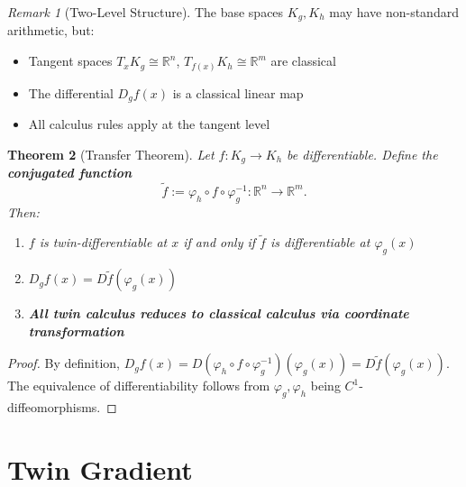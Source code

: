 \documentclass[11pt,twoside]{book}
\theoremstyle{plain}
\newtheorem{theorem}{Theorem}[chapter]
\theoremstyle{definition}
\theoremstyle{remark}
\newtheorem{remark}[theorem]{Remark}
\newcommand{\R}{\mathbb{R}}
\newcommand{\Kg}{K_g}
\newcommand{\Dg}{D_g}
\begin{document}
\begin{remark}[Two-Level Structure]
    The base spaces $\Kg, K_h$ may have non-standard arithmetic, but:
    \begin{itemize}
        \item Tangent spaces $T_x \Kg \cong \R^n$, $T_{f(x)} K_h \cong \R^m$ are classical
        \item The differential $\Dg f(x)$ is a classical linear map
        \item All calculus rules apply at the tangent level
    \end{itemize}
\end{remark}

\begin{theorem}[Transfer Theorem]
    \label{thm:transfer}
    Let $f : \Kg \to K_h$ be differentiable. Define the \textbf{conjugated function}
    \[
    \tilde{f} := \varphi_h \circ f \circ \varphi_g^{-1} : \R^n \to \R^m.
    \]
    Then:
    \begin{enumerate}
        \item $f$ is twin-differentiable at $x$ if and only if $\tilde{f}$ is differentiable at $\varphi_g(x)$
        \item $\Dg f(x) = D\tilde{f}(\varphi_g(x))$
        \item \textbf{All twin calculus reduces to classical calculus via coordinate transformation}
    \end{enumerate}
    
    \begin{center}
    \end{center}
\end{theorem}

\begin{proof}
    By definition, $\Dg f(x) = D(\varphi_h \circ f \circ \varphi_g^{-1})(\varphi_g(x)) = D\tilde{f}(\varphi_g(x))$. The equivalence of differentiability follows from $\varphi_g, \varphi_h$ being $C^1$-diffeomorphisms.
\end{proof}

\section{Twin Gradient}
\label{sec:twin_gradient}
\end{document}
